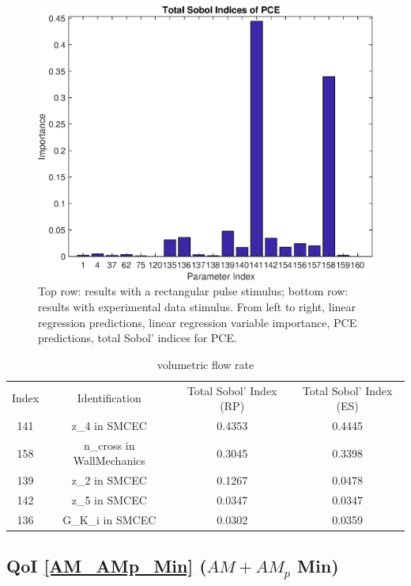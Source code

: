 \documentclass[12pt]{article}
\numberwithin{equation}{section}
\begin{document}
\begin{figure}[h]
\includegraphics[width=.24 \textwidth]{Figures/Vol_Flow_QoI_PCE_SI_Experimental.eps}
\caption{Top row: results with a rectangular pulse stimulus; bottom row: results with experimental data stimulus. From left to right, linear regression predictions, linear regression variable importance, PCE predictions, total Sobol' indices for PCE.}
\vspace{-.5 cm}
\end{figure}

\begin{table}[h]
\centering
\begin{tabular}{cccc}
Index & Identification & Total Sobol' Index (RP) & Total Sobol' Index (ES)\\
141 &  z\_4 in SMCEC &  0.4353 & 0.4445\\
158 & n\_cross in WallMechanics & 0.3045 & 0.3398\\
 139 & z\_2 in SMCEC & 0.1267 & 0.0478\\
 142 & z\_5 in SMCEC & 0.0347 & 0.0347\\
  136 & G\_K\_i in SMCEC & 0.0302 & 0.0359\\
\end{tabular}
\caption{volumetric flow rate}
\vspace{-1.5 cm}
\label{qoi_vol_flow}
\end{table}

\newpage
\subsection{QoI \eqref{AM_AMp_Min} ($AM+AM_p$ Min)}
\end{document}
